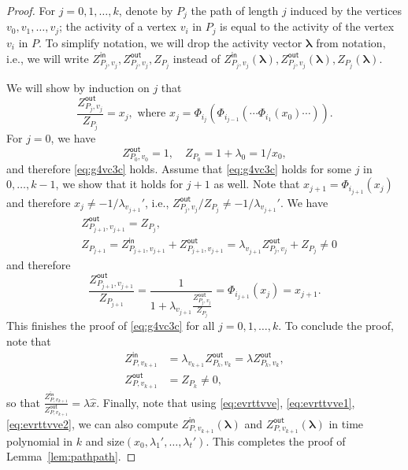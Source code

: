 \documentclass[11pt]{article}
\def\Zin{Z^{\mathsf{in}}}
\def\Zout{Z^{\mathsf{out}}}
\newcommand{\size}[1]{\mathrm{size}(#1)}
\def\lambdab{\ensuremath{\boldsymbol{\lambda}}}
\begin{document}
\begin{proof}
For $j=0,1,\hdots, k$, denote by $P_j$ the path of length $j$ induced by the vertices $v_0,v_1,\hdots, v_j$; the activity of a vertex $v_i$ in $P_j$ is equal to the activity of the vertex $v_i$ in $P$.  To simplify notation, we will drop the activity vector $\lambdab$ from notation, i.e., we will write $\Zin_{P_j,v_j}, \Zout_{P_j,v_j}, Z_{P_j}$ instead of $\Zin_{P_j,v_j}(\lambdab), \Zout_{P_j,v_j}(\lambdab), Z_{P_j}(\lambdab)$.

We will show by induction on $j$ that
\begin{equation}\label{eq:g4vc3c}
\frac{\Zout_{P_j,v_{j}}}{Z_{P_j}}=x_j, \mbox{ where } x_j=\Phi_{i_j}(\Phi_{i_{j-1}}(\cdots\Phi_{i_1}(x_0)\cdots)).
\end{equation}
For $j=0$, we  have 
\begin{equation}\label{eq:evrttvve}
\Zout_{P_0,v_{0}}=1,\quad Z_{P_0}=1+\lambda_0=1/x_0,
\end{equation}
and therefore \eqref{eq:g4vc3c} holds. Assume that \eqref{eq:g4vc3c} holds for some $j$ in $0,\hdots, k-1$, we show that it holds for $j+1$ as well. Note that $x_{j+1}=\Phi_{i_{j+1}}(x_j)$ and therefore $x_j\neq -1/\lambda_{v_{j+1}}'$, i.e.,  $\Zout_{P_j,v_{j}}/Z_{P_j}\neq -1/\lambda_{v_{j+1}}'$. We have 
\begin{equation}\label{eq:evrttvve1}
\begin{aligned}
&\Zout_{P_{j+1},v_{j+1}}=Z_{P_j},\\ 
&Z_{P_{j+1}}=\Zin_{P_{j+1},v_{j+1}}+\Zout_{P_{j+1},v_{j+1}}=\lambda_{v_{j+1}}\Zout_{P_{j},v_{j}}+Z_{P_j}\neq 0
\end{aligned}
\end{equation}
and therefore
\begin{equation*}
\frac{\Zout_{P_{j+1},v_{j+1}}}{Z_{P_{j+1}}}=\frac{1}{1+\lambda_{v_{j+1}}\frac{\Zout_{P_{j},v_{j}}}{Z_{P_j}}}=\Phi_{i_{j+1}}(x_j)=x_{j+1}.
\end{equation*}
This finishes the proof of \eqref{eq:g4vc3c} for all $j=0,1,\hdots, k$. To conclude the proof, note that 
\begin{equation}\label{eq:evrttvve2}
\begin{aligned}
\Zin_{P,v_{k+1}}&=\lambda_{v_{k+1}} \Zout_{P_k,v_k}=\lambda \Zout_{P_k,v_k},\\ 
\Zout_{P,v_{k+1}}&=Z_{P_k}\neq 0,
\end{aligned}
\end{equation} 
so that $\frac{\Zin_{P,v_{k+1}}}{\Zout_{P,v_{k+1}}}=\lambda\hat{x}$. Finally, note that using \eqref{eq:evrttvve}, \eqref{eq:evrttvve1}, \eqref{eq:evrttvve2}, we can also compute $\Zin_{P,v_{k+1}}(\lambdab)$ and $\Zout_{P,v_{k+1}}(\lambdab)$ in time polynomial in $k$ and $\size{x_0,\lambda_1',\hdots,\lambda_t'}$. This completes the proof of Lemma~\ref{lem:pathpath}.
\end{proof}
\end{document}
